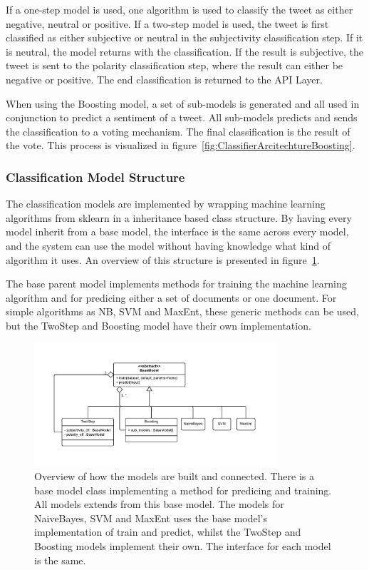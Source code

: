 If a one-step model is used, one algorithm is used to classify the tweet as either negative, neutral or positive. If a two-step model is used, the tweet is first classified as either subjective or neutral in the subjectivity classification step. If it is neutral, the model returns with the classification. If the result is subjective, the tweet is sent to the polarity classification step, where the result can either be negative or positive. The end classification is returned to the API Layer.

When using the Boosting model, a set of sub-models is generated and all used in conjunction to predict a sentiment of a tweet. All sub-models predicts and sends the classification to a voting mechanism. The final classification is the result of the vote. This process is visualized in figure~\ref{fig:ClassifierArcitechtureBoosting}.

\subsubsection{Classification Model Structure}

The classification models are implemented by wrapping machine learning algorithms from sklearn in a inheritance based class structure. By having every model inherit from a base model, the interface is the same across every model, and the system can use the model without having knowledge what kind of algorithm it uses. An overview of this structure is presented in figure~\ref{fig:ModelsStructure}.

The base parent model implements methods for training the machine learning algorithm and for predicing either a set of documents or one document. For simple algorithms as NB, SVM and MaxEnt, these generic methods can be used, but the TwoStep and Boosting model have their own implementation. 
 
\begin{figure}[htb!]
 \begin{center}
     \includegraphics[width=0.8\textwidth]{../img/ModelsStructure.pdf}
 \end{center}
 \caption[Classification Model Structure Overview]{Overview of how the models are built and connected. There is a base model class implementing a method for predicing and training. All models extends from this base model. The models for NaiveBayes, SVM and MaxEnt uses the base model's implementation of train and predict, whilst the TwoStep and Boosting models implement their own. The interface for each model is the same.}
 \label{fig:ModelsStructure}
\end{figure}


